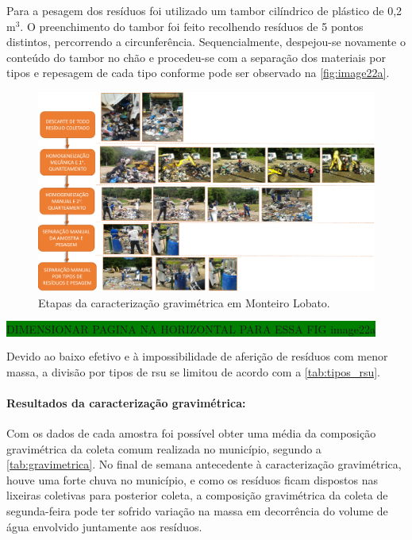 Para a pesagem dos resíduos foi utilizado um tambor cilíndrico de plástico de 0,2 m$^{3}$. O preenchimento do tambor foi feito recolhendo resíduos de 5 pontos distintos, percorrendo a circunferência. Sequencialmente, despejou-se novamente o conteúdo do tambor no chão e procedeu-se com a separação dos materiais por tipos e repesagem de cada tipo conforme pode ser observado na \autoref{fig:image22a}.

\begin{figure}
	\centering
	\includegraphics[width=0.7\linewidth]{produtos/prodtres/image22a}
	\caption{Etapas da caracterização gravimétrica em Monteiro Lobato.}
	\label{fig:image22a}
\end{figure}

\colorbox{green}{DIMENSIONAR PAGINA NA HORIZONTAL PARA ESSA FIG image22a}

Devido ao baixo efetivo e à impossibilidade de aferição de resíduos com menor massa, a divisão por tipos de \gls{rsu} se limitou de acordo com a \autoref{tab:tipos_rsu}.

	


\paragraph{\textbf{Resultados da caracterização gravimétrica:}}

Com os dados de cada amostra foi possível obter uma média da composição gravimétrica da coleta comum realizada no município, segundo a \autoref{tab:gravimetrica}. No final de semana antecedente à caracterização gravimétrica, houve uma forte chuva no município, e como os resíduos ficam dispostos nas lixeiras coletivas para posterior coleta, a composição gravimétrica da coleta de segunda-feira pode ter sofrido variação na massa em decorrência do volume de água envolvido juntamente aos resíduos.




